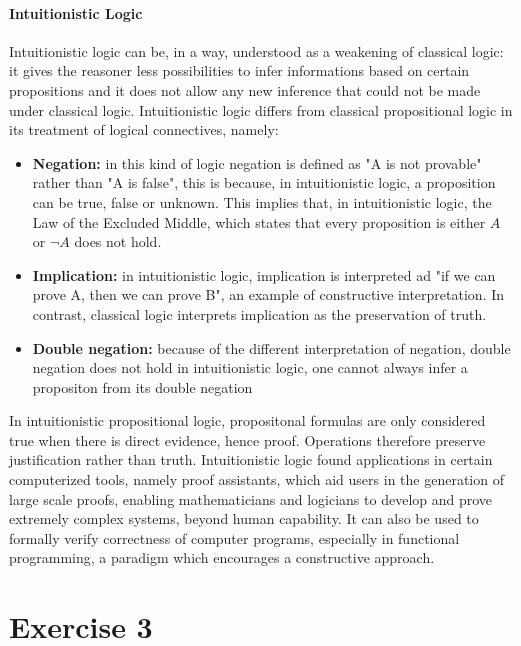 \documentclass[11pt]{exam}
\begin{document}
\paragraph*{Intuitionistic Logic}
Intuitionistic logic can be, in a way, understood as a weakening of classical logic: it gives the reasoner less possibilities to infer informations based on certain propositions and it does not allow any new inference that could not be made under classical logic.
Intuitionistic logic differs from classical propositional logic in its treatment of logical connectives, namely:
\begin{itemize}
    \item \textbf{Negation:} in this kind of logic negation is defined as "A is not provable" rather than "A is false", this is because, in intuitionistic logic, a proposition can be true, false or unknown. This implies that, in intuitionistic logic, the Law of the Excluded Middle, which states that every proposition is either \(A\) or \(\neg A\) does not hold.
    \item \textbf{Implication:} in intuitionistic logic, implication is interpreted ad "if we can prove A, then we can prove B", an example of constructive interpretation. In contrast, classical logic interprets implication as the preservation of truth.
    \item \textbf{Double negation:} because of the different interpretation of negation, double negation does not hold in intuitionistic logic, one cannot always infer a propositon from its double negation
\end{itemize}
In intuitionistic propositional logic, propositonal formulas are only considered true when there is direct evidence, hence proof. Operations therefore preserve justification rather than truth.
Intuitionistic logic found applications in certain computerized tools, namely proof assistants, which aid users in the generation of large scale proofs, enabling mathematicians and logicians to develop and prove extremely complex systems, beyond human capability.
It can also be used to formally verify correctness of computer programs, especially in functional programming, a paradigm which encourages a constructive approach.
\section*{Exercise 3}
\end{document}
